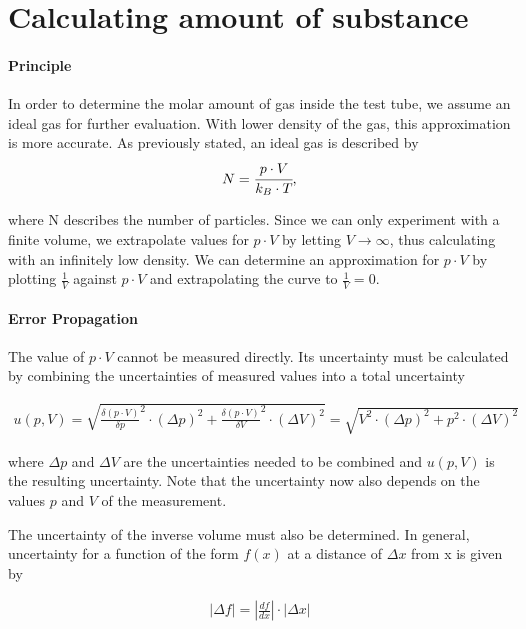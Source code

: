\documentclass[10pt,a4paper]{article}
\begin{document}
\section{Calculating amount of substance}
\medskip

\paragraph{Principle}

In order to determine the molar amount of gas inside the test tube, we assume an ideal gas for further evaluation. With lower density of the gas, this approximation is more accurate.
As previously stated, an ideal gas is described by
\begin{align}
N = \cfrac{p \cdot V}{k_B \cdot T},
\end{align}
\raggedright where N describes the number of particles. Since we can only experiment with a finite volume, we extrapolate values for $p \cdot V$ by letting $V \rightarrow \infty$, thus calculating with an infinitely low density. We can determine an approximation for $p \cdot V$ by plotting $\frac{1}{V}$ against $p \cdot V$ and extrapolating the curve to $\frac{1}{V} = 0$. 

\paragraph{Error Propagation}

The value of $p \cdot V$ cannot be measured directly. Its uncertainty must be calculated by combining the uncertainties of measured values into a total uncertainty 

\begin{align}
u(p, V)  = \sqrt{\frac{\delta (p \cdot V)}{\delta p} ^2 \cdot (\Delta p)^2 + \frac{\delta (p \cdot V)}{\delta V} ^2 \cdot (\Delta V)^2} = \sqrt{V^2 \cdot (\Delta p)^2 + p^2 \cdot (\Delta V)^2}
\end{align}

where $\Delta p$ and $\Delta V$ are the uncertainties needed to be combined and $u(p,V)$ is the resulting uncertainty. Note that the uncertainty now also depends on the values $p$ and $V$ of the measurement.

\medskip

The uncertainty of the inverse volume must also be determined. In general, uncertainty for a function of the form $f(x)$ at a distance of $\Delta x$ from x is given by

\begin{align}
|\Delta f| = |\frac{df}{dx}| \cdot |\Delta x|
\end{align}
\end{document}
